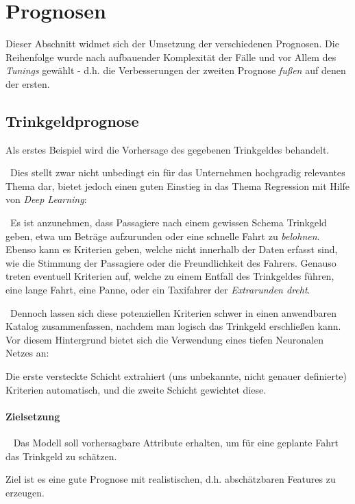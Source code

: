 \newpage
\section{Prognosen}
\label{Prognosen}
Dieser Abschnitt widmet sich der Umsetzung der verschiedenen Prognosen. Die Reihenfolge wurde nach aufbauender Komplexität der Fälle und vor Allem des \textit{Tunings} gewählt - d.h. die Verbesserungen der zweiten Prognose \textit{fußen} auf denen der ersten.
\subsection{Trinkgeldprognose}
\label{sec:TipPred}
Als erstes Beispiel wird die Vorhersage des gegebenen Trinkgeldes behandelt. 

~\newline Dies stellt zwar nicht unbedingt ein für das Unternehmen hochgradig relevantes Thema dar, bietet jedoch einen guten Einstieg in das Thema Regression mit Hilfe von \textit{Deep Learning}:

~\newline Es ist anzunehmen, dass Passagiere nach einem gewissen Schema Trinkgeld geben, etwa um Beträge aufzurunden oder eine schnelle Fahrt zu \textit{belohnen}. Ebenso kann es Kriterien geben, welche nicht innerhalb der Daten erfasst sind, wie die Stimmung der Passagiere oder die Freundlichkeit des Fahrers. Genauso treten eventuell Kriterien auf, welche zu einem Entfall des Trinkgeldes führen, eine lange Fahrt, eine Panne, oder ein Taxifahrer der \textit{Extrarunden dreht}. 

~\newline Dennoch lassen sich diese potenziellen Kriterien schwer in einen anwendbaren Katalog zusammenfassen, nachdem man logisch das Trinkgeld erschließen kann. Vor diesem Hintergrund bietet sich die Verwendung eines tiefen Neuronalen Netzes an: 

Die erste versteckte Schicht extrahiert (uns unbekannte, nicht genauer definierte) Kriterien automatisch, und die zweite Schicht gewichtet diese. 
\paragraph{Zielsetzung} ~\newline
Das Modell soll vorhersagbare Attribute erhalten, um für eine geplante Fahrt das Trinkgeld zu schätzen. 

Ziel ist es eine gute Prognose mit realistischen, d.h. abschätzbaren Features zu erzeugen. 

